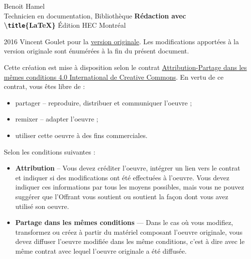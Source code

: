 \small


\begin{frame}
	
	\tiny
	Benoit Hamel \\
	Technicien en documentation, Bibliothèque
	\vfill
	{\Huge\bfseries Rédaction avec \\
	\textbackslash \texttt{title}\{\textrm{\LaTeX}\}}
	\vfill
	Édition HEC Montréal
	
\end{frame}


\begin{frame}
	
	\tiny
	{\faCopyright} 2016 Vincent Goulet pour la
	\href{https://ctan.org/pkg/formation-latex-ul}{version originale}. Les modifications apportées à
	la version originale sont énumérées à la fin du présent document.
	
	{\faCreativeCommons} Cette création est mise à disposition selon le contrat
	\href{http://creativecommons.org/licenses/by-sa/4.0/deed.fr}%
	{Attribution-Partage dans les mêmes conditions 4.0 International de Creative Commons}.
	En vertu de ce contrat, vous êtes libre de :
	
	\begin{itemize}
		\item partager -- reproduire, distribuer et communiquer l’oeuvre ;
		\item remixer -- adapter l’oeuvre ;
		\item utiliser cette oeuvre à des fins commerciales.
	\end{itemize}

	Selon les conditions suivantes :
	
	\begin{itemize}
		
		\item \textbf{Attribution} -- Vous devez créditer l’oeuvre, intégrer un lien vers le contrat et indiquer si des modifications ont été effectuées	à l’oeuvre. Vous devez indiquer ces informations par tous les moyens possibles, mais vous ne pouvez suggérer que l’Offrant vous soutient ou soutient la façon dont vous avez utilisé son oeuvre.
		
		\item \textbf{Partage dans les mêmes conditions} — Dans le cas où vous modifiez, transformez ou créez à partir du matériel composant l’oeuvre originale, vous devez diffuser l’oeuvre modifiée dans les même conditions, c’est à dire avec le même contrat avec	lequel l’oeuvre originale a été diffusée.
		
	\end{itemize}

\end{frame}

